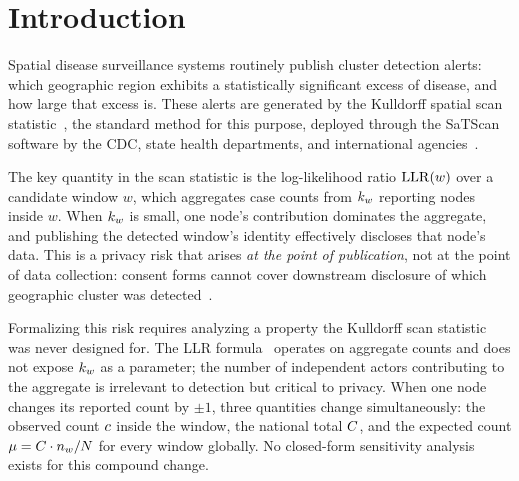 
\section{Introduction}
\label{sec:intro}



Spatial disease surveillance systems routinely publish cluster detection alerts:
which geographic region exhibits a statistically significant excess of disease,
and how large that excess is.
These alerts are generated by the Kulldorff spatial scan statistic~\cite{kulldorff1997},
the standard method for this purpose, deployed through the SaTScan software by the
CDC, state health departments, and international agencies~\cite{desjardins2020,kulldorff2005}.

The key quantity in the scan statistic is the log-likelihood ratio $\mathrm{LLR}(w)$ over
a candidate window $w$, which aggregates case counts from $k_w$ reporting nodes
inside $w$.
When $k_w$ is small, one node's contribution dominates the aggregate, and publishing
the detected window's identity effectively discloses that node's data.
This is a privacy risk that arises \emph{at the point of publication}, not at the
point of data collection:
consent forms cannot cover downstream disclosure of which geographic cluster was
detected~\cite{persad2025,smith2025}.


Formalizing this risk requires analyzing a property the Kulldorff scan statistic
was never designed for.
The LLR formula~\cite{kulldorff1997} operates on aggregate counts and does not
expose $k_w$ as a parameter; the number of independent actors contributing to the
aggregate is irrelevant to detection but critical to privacy.
When one node changes its reported count by $\pm 1$, three quantities change
simultaneously: the observed count $c$ inside the window, the national total
$C$, and the expected count $\mu = C \cdot n_w / N$ for every
window globally.
No closed-form sensitivity analysis exists for this compound change.

